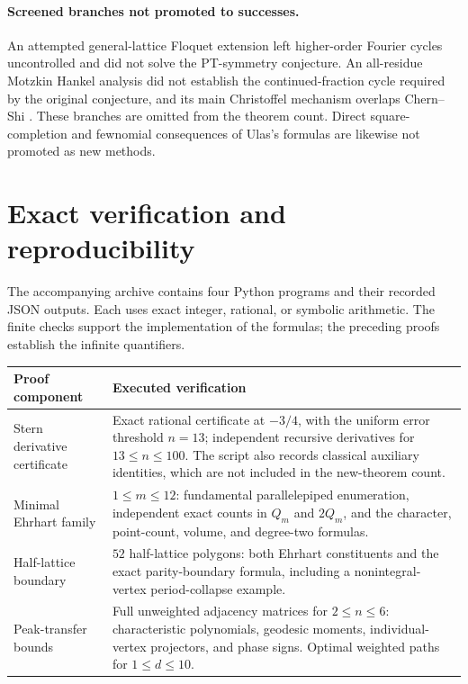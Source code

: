 \documentclass[11pt,a4paper]{article}
\theoremstyle{definition}\newtheorem{definition}[lemma]{Definition}
\theoremstyle{remark}\newtheorem{remark}[lemma]{Remark}
\begin{document}
\paragraph{Screened branches not promoted to successes.}
An attempted general-lattice Floquet extension left higher-order Fourier
cycles uncontrolled and did not solve the PT-symmetry conjecture.
An all-residue Motzkin Hankel analysis did not establish the continued-fraction
cycle required by the original conjecture, and its main Christoffel
mechanism overlaps Chern--Shi \cite{ChernShi26}. These branches are omitted
from the theorem count. Direct square-completion and fewnomial consequences
of Ulas's formulas are likewise not promoted as new methods.

\appendix
\section{Exact verification and reproducibility}

The accompanying archive contains four Python programs and their recorded
JSON outputs. Each uses exact integer, rational, or symbolic arithmetic.
The finite checks support the implementation of the formulas; the preceding
proofs establish the infinite quantifiers.

\begin{center}\small
\begin{tabular}{@{}p{}p{}@{}}
\toprule
Proof component & Executed verification \\
\midrule
Stern derivative certificate & Exact rational certificate at $-3/4$, with
the uniform error threshold $n=13$; independent recursive derivatives for
$13\leq n\leq100$. The script also records classical auxiliary identities,
which are not included in the new-theorem count.\\
Minimal Ehrhart family & $1\leq m\leq12$: fundamental parallelepiped
enumeration, independent exact counts in $Q_m$ and $2Q_m$, and the character,
point-count, volume, and degree-two formulas.\\
Half-lattice boundary & $52$ half-lattice polygons: both Ehrhart constituents
and the exact parity-boundary formula, including a nonintegral-vertex
period-collapse example.\\
Peak-transfer bounds & Full unweighted adjacency matrices for $2\leq n\leq6$:
characteristic polynomials, geodesic moments, individual-vertex projectors,
and phase signs. Optimal weighted paths for $1\leq d\leq10$.\\
\bottomrule
\end{tabular}
\end{center}
\end{document}
